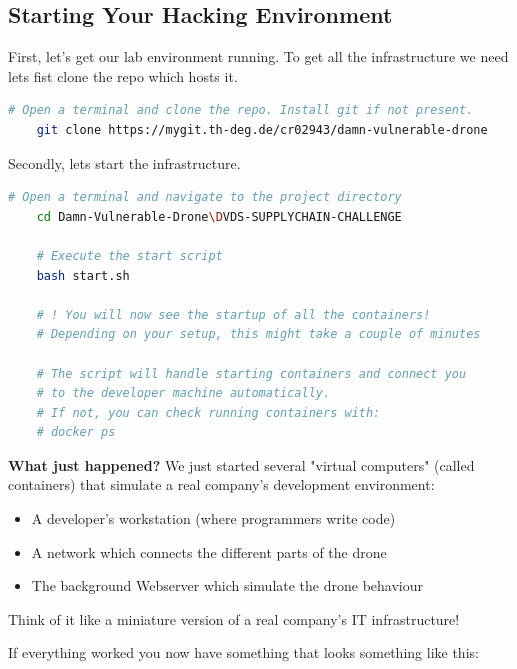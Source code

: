 \documentclass[12pt]{scrartcl}
\newenvironment{hintbox}{%
    \def\FrameCommand{\fboxsep=\FrameSep\colorbox{hintgreen!20}}%
    \MakeFramed {\advance\hsize-\width \FrameRestore}}%
    {\endMakeFramed}
\begin{document}
    \subsection{Starting Your Hacking Environment}

    First, let's get our lab environment running.
    To get all the infrastructure we need lets fist clone the repo which hosts it. 
    \begin{lstlisting}[language=bash, caption=Cloning the required repo]
    # Open a terminal and clone the repo. Install git if not present.
    git clone https://mygit.th-deg.de/cr02943/damn-vulnerable-drone
    \end{lstlisting}

    Secondly, lets start the infrastructure.

    \begin{lstlisting}[language=bash, caption=Starting the Lab Environment]
    # Open a terminal and navigate to the project directory
    cd Damn-Vulnerable-Drone\DVDS-SUPPLYCHAIN-CHALLENGE

    # Execute the start script
    bash start.sh

    # ! You will now see the startup of all the containers! 
    # Depending on your setup, this might take a couple of minutes

    # The script will handle starting containers and connect you
    # to the developer machine automatically.
    # If not, you can check running containers with:
    # docker ps
    \end{lstlisting}

    \begin{hintbox}
    \noindent
    \textbf{What just happened?}
    \noindent
    We just started several "virtual computers" (called containers) that simulate a real company's development environment:
    \begin{itemize}
        \item A developer's workstation (where programmers write code)
        \item A network which connects the different parts of the drone
        \item The background Webserver which simulate the drone behaviour
    \end{itemize}

    \noindent
    Think of it like a miniature version of a real company's IT infrastructure!
    \end{hintbox}

    If everything worked you now have something that looks something like this:
\end{document}
